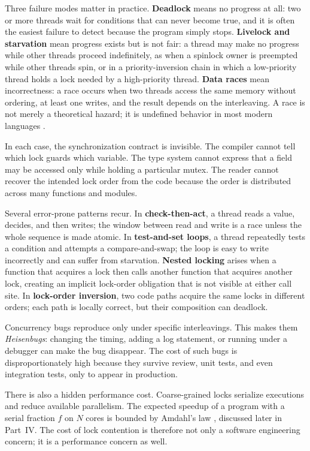 Three failure modes matter in practice. \textbf{Deadlock} means no progress at
all: two or more threads wait for conditions that can never become true, and
it is often the easiest failure to detect because the program simply stops.
\textbf{Livelock and starvation} mean progress exists but is not fair: a
thread may make no progress while other threads proceed indefinitely, as when a
spinlock owner is preempted while other threads spin, or in a
priority-inversion chain in which a low-priority thread holds a lock needed by
a high-priority thread. \textbf{Data races} mean incorrectness: a race occurs
when two threads access the same memory without ordering, at least one writes,
and the result depends on the interleaving. A race is not merely a theoretical
hazard; it is undefined behavior in most modern languages
\cite{boehm08memory}.

In each case, the synchronization contract is invisible. The compiler cannot
tell which lock guards which variable. The type system cannot express that a
field may be accessed only while holding a particular mutex. The reader cannot
recover the intended lock order from the code because the order is distributed
across many functions and modules.

Several error-prone patterns recur. In \textbf{check-then-act}, a thread reads
a value, decides, and then writes; the window between read and write is a race
unless the whole sequence is made atomic. In \textbf{test-and-set loops}, a
thread repeatedly tests a condition and attempts a compare-and-swap; the loop
is easy to write incorrectly and can suffer from starvation. \textbf{Nested
locking} arises when a function that acquires a lock then calls another
function that acquires another lock, creating an implicit lock-order
obligation that is not visible at either call site. In \textbf{lock-order
inversion}, two code paths acquire the same locks in different orders; each
path is locally correct, but their composition can deadlock.

Concurrency bugs reproduce only under specific interleavings. This makes them
\emph{Heisenbugs}: changing the timing, adding a log statement, or running
under a debugger can make the bug disappear. The cost of such bugs is
disproportionately high because they survive review, unit tests, and even
integration tests, only to appear in production.

There is also a hidden performance cost. Coarse-grained locks serialize
executions and reduce available parallelism. The expected speedup of a program
with a serial fraction $f$ on $N$ cores is bounded by Amdahl's law
\cite{amdahl67}, discussed later in Part~IV. The cost of lock contention is
therefore not only a software engineering concern; it is a performance concern
as well.

